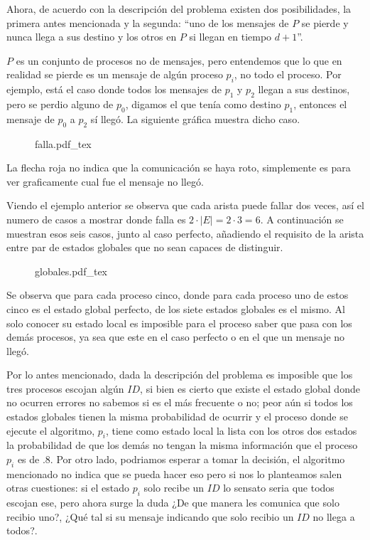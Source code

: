 \documentclass[8pt, letterpaper]{article}
\begin{document}
\begin{enumerate}
  Ahora, de acuerdo con la descripción del problema existen dos posibilidades,
  la primera antes mencionada y la segunda: ``uno de los mensajes de $P$ se
  pierde y nunca llega a sus destino y los otros en $P$ si llegan en
  tiempo $d+1$''.

  $P$ es un conjunto de procesos no de mensajes, pero entendemos que lo que
  en realidad se pierde es un mensaje de algún proceso $p_i$, no todo el
  proceso. Por ejemplo, está el caso donde todos los mensajes de $p_1$ y
  $p_2$ llegan a sus destinos, pero se perdio alguno de $p_0$, digamos el
  que tenía como destino $p_1$, entonces el mensaje de $p_0$ a $p_2$ sí
  llegó. La siguiente gráfica muestra dicho caso.
  \begin{figure}[h]
    \centering
    \def\svgwidth{5cm}
    {falla.pdf_tex}
  \end{figure}

  La flecha roja no indica que la comunicación se haya roto, simplemente es para
  ver graficamente cual fue el mensaje no llegó.

  Viendo el ejemplo anterior se observa que cada arista puede fallar dos veces,
  así el numero de casos a mostrar donde falla es $2\cdot |E| = 2 \cdot 3 = 6$. 
  \newpage
  A continuación se muestran esos seis casos, junto al caso perfecto, añadiendo
  el requisito de la arista entre par de estados globales que no sean capaces
  de distinguir.
  \begin{figure}[h]
    \centering
    \def\svgwidth{15cm}
    {globales.pdf_tex}
  \end{figure}
  \hfill\break
  Se observa que para cada proceso cinco, donde para cada proceso uno de estos
  cinco es el estado global perfecto, de los siete estados globales es el
  mismo. Al solo conocer su estado local es imposible para el proceso saber
  que pasa con los demás procesos, ya sea que este en el caso perfecto o en
  el que un mensaje no llegó.

  Por lo antes mencionado, dada la descripción del problema es imposible que
  los tres procesos escojan algún $ID$, si bien es cierto que existe el estado
  global donde no ocurren errores no sabemos si es el más frecuente o no;
  peor aún si todos los estados globales tienen la misma probabilidad de ocurrir
  y el proceso donde se ejecute el algoritmo, $p_i$, tiene como estado local
  la lista con los otros dos estados la probabilidad de que los demás no
  tengan la misma información que el proceso $p_i$ es de $.8$. Por otro lado,
  podriamos esperar a tomar la decisión, el algoritmo mencionado no indica que
  se pueda hacer eso pero si nos lo planteamos  salen otras cuestiones:
  si el estado $p_i$ solo recibe un $ID$ lo sensato seria que todos escojan
  ese, pero ahora surge la duda ¿De que manera les comunica que solo recibio
  uno?, ¿Qué tal si su mensaje indicando que solo recibio un $ID$ no llega a
  todos?.


\end{enumerate}
\end{document}
